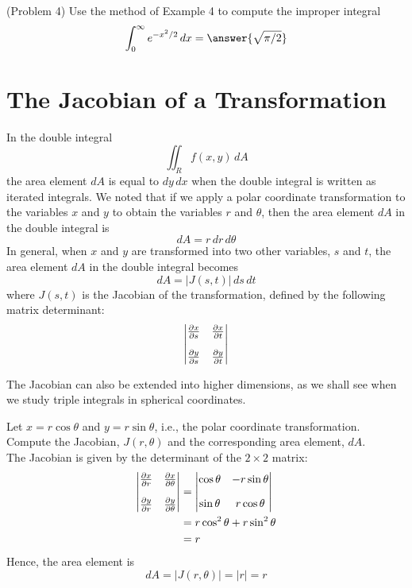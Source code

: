 \documentclass[handout]{ximera}
\begin{document}
\begin{problem}(Problem 4)
Use the method of Example 4 to compute the improper integral
\[
\int_0^{\infty} e^{-x^2/2} \, dx = \answer{\sqrt{\pi/2}}
\]
\end{problem}


\section{The Jacobian of a Transformation}
In the double integral 
\[
\iint_R f(x,y) \, dA
\]
the area element $dA$ is equal to $dy \, dx$ when the double integral is written as iterated integrals.
We noted that if we apply a polar coordinate transformation to the variables $x$ and $y$ 
to obtain the variables $r$ and $\theta$, then the area element $dA$ in the double integral is
\[
dA = r \, dr \, d\theta
\]
In general, when $x$ and $y$ are transformed into two other variables, $s$ and $t$, the area element $dA$
in the double integral becomes
\[
dA = |J(s, t)| \, ds \, dt
\]
where $J(s,t)$ is the Jacobian of the transformation, defined by the following matrix determinant:
\[
\begin{vmatrix}
\pp[x]{s} & \pp[x]{t}\\[10pt]
\pp[y]{s} & \pp[y]{t}\\
\end{vmatrix}
\]

\begin{remark}
The Jacobian can also be extended into higher dimensions, as we shall see when we study triple integrals in spherical coordinates.
\end{remark}

\begin{example}[Example 5]
Let $x = r\cos \theta$ and $y = r\sin \theta$, i.e., the polar coordinate transformation. Compute the Jacobian, $J(r, \theta)$ and the corresponding area element, $dA$.\\
The Jacobian is given by the determinant of the $2 \times 2$ matrix:
\begin{align*}
\begin{vmatrix}
\pp[x]{r} & \pp[x]{\theta}\\[10pt]
\pp[y]{r} & \pp[y]{\theta}\\
\end{vmatrix}
&= 
\begin{vmatrix}
\cos \theta & -r\sin\theta\\[10pt]
\sin \theta & r\cos\theta\\
\end{vmatrix}\\
&= r \cos^2 \theta + r \sin^2 \theta\\
&= r
\end{align*}
Hence, the area element is
\[
dA = |J(r, \theta)|= |r| = r
\]
\end{example}
\end{document}
